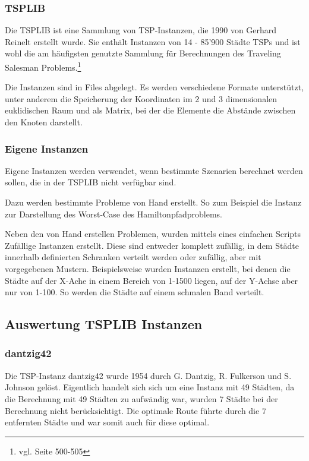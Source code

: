 \documentclass[11pt,a4paper]{article}
\begin{document}
\subsubsection{TSPLIB}
Die TSPLIB ist eine Sammlung von TSP-Instanzen, die 1990 von Gerhard Reinelt erstellt wurde. Sie enthält Instanzen von 14 - 85'900 Städte TSPs und ist wohl die am häufigsten genutzte Sammlung für Berechnungen des Traveling Salesman Problems.\footnote{vgl. \cite{applegate06} Seite 500-505}

Die Instanzen sind in Files abgelegt. Es werden verschiedene Formate unterstützt, unter anderem die Speicherung der Koordinaten im 2 und 3 dimensionalen euklidischen Raum und als Matrix, bei der die Elemente die Abstände zwischen den Knoten darstellt.

\subsubsection{Eigene Instanzen}
Eigene Instanzen werden verwendet, wenn bestimmte Szenarien berechnet werden sollen, die in der TSPLIB nicht verfügbar sind.

Dazu werden bestimmte Probleme von Hand erstellt. So zum Beispiel die Instanz zur Darstellung des Worst-Case des Hamiltonpfadproblems.

Neben den von Hand erstellen Problemen, wurden mittels eines einfachen Scripts Zufällige Instanzen erstellt. Diese sind entweder komplett zufällig, in dem Städte innerhalb definierten Schranken verteilt werden oder zufällig, aber mit vorgegebenen Mustern. Beispielsweise wurden Instanzen erstellt, bei denen die Städte auf der X-Ache in einem Bereich von 1-1500 liegen, auf der Y-Achse aber nur von 1-100. So werden die Städte auf einem schmalen Band verteilt.

\subsection{Auswertung TSPLIB Instanzen}
\subsubsection{dantzig42}
Die TSP-Instanz dantzig42 wurde 1954 durch G. Dantzig, R. Fulkerson und S. Johnson gelöst. Eigentlich handelt sich sich um eine Instanz mit 49 Städten, da die Berechnung mit 49 Städten zu aufwändig war, wurden 7 Städte bei der Berechnung nicht berücksichtigt. Die optimale Route führte durch die 7 entfernten Städte und war somit auch für diese optimal.
\end{document}
